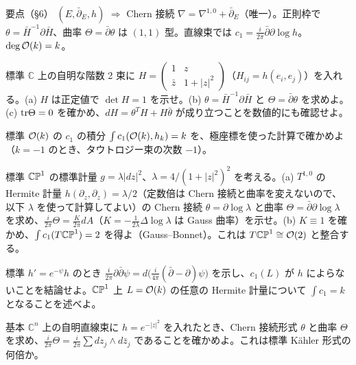 \begin{keybox}{要点（§6）}
$(E,\bar\partial_E,h)$ $\Rightarrow$ Chern 接続 $\nabla=\nabla^{1,0}+\bar\partial_E$（唯一）。正則枠で $\theta=\bar H^{-1}\partial\bar H$、曲率 $\Theta=\bar\partial\theta$ は $(1,1)$ 型。直線束では $c_1=\frac i{2\pi}\bar\partial\partial\log h$。$\deg\mathcal O(k)=k$。
\end{keybox}

\begin{prob}{標準}\label{p:rank2}
$\mathbb C$ 上の自明な階数 2 束に $H=\begin{pmatrix}1&z\\ \bar z&1+|z|^2\end{pmatrix}$（$H_{ij}=h(e_i,e_j)$）を入れる。(a) $H$ は正定値で $\det H=1$ を示せ。(b) $\theta=\bar H^{-1}\partial\bar H$ と $\Theta=\bar\partial\theta$ を求めよ。(c) $\mathrm{tr}\Theta=0$ を確かめ、$dH=\theta^TH+H\bar\theta$ が成り立つことを数値的にも確認せよ。
\end{prob}
\begin{prob}{標準}\label{p:degk}
$\mathcal O(k)$ の $c_1$ の積分 $\int c_1(\mathcal O(k),h_k)=k$ を、極座標を使った計算で確かめよ（$k=-1$ のとき、タウトロジー束の次数 $-1$）。
\end{prob}
\begin{prob}{標準}\label{p:TP1}
$\mathbb{CP}^1$ の標準計量 $g=\lambda|dz|^2$、$\lambda=4/(1+|z|^2)^2$ を考える。(a) $T^{1,0}$ の Hermite 計量 $h(\partial_z,\partial_z)=\lambda/2$（定数倍は Chern 接続と曲率を変えないので、以下 $\lambda$ を使って計算してよい）の Chern 接続 $\theta=\partial\log\lambda$ と曲率 $\Theta=\bar\partial\partial\log\lambda$ を求め、$\frac i{2\pi}\Theta=\frac K{2\pi}dA$（$K=-\frac1{2\lambda}\Delta\log\lambda$ は Gauss 曲率）を示せ。(b) $K\equiv1$ を確かめ、$\int c_1(T\mathbb{CP}^1)=2$ を得よ（Gauss--Bonnet）。これは $T\mathbb{CP}^1\cong\mathcal O(2)$ と整合する。
\end{prob}
\begin{prob}{標準}\label{p:indep}
$h'=e^{-\psi}h$ のとき $\frac i{2\pi}\partial\bar\partial\psi=d\big(\frac i{4\pi}(\bar\partial-\partial)\psi\big)$ を示し、$c_1(L)$ が $h$ によらないことを結論せよ。$\mathbb{CP}^1$ 上 $L=\mathcal O(k)$ の任意の Hermite 計量について $\int c_1=k$ となることを述べよ。
\end{prob}
\begin{prob}{基本}\label{p:weight}
$\mathbb C^n$ 上の自明直線束に $h=e^{-|z|^2}$ を入れたとき、Chern 接続形式 $\theta$ と曲率 $\Theta$ を求め、$\frac i{2\pi}\Theta=\frac i{2\pi}\sum dz_j\wedge d\bar z_j$ であることを確かめよ。これは標準 Kähler 形式の何倍か。
\end{prob}

